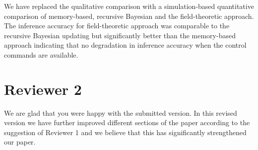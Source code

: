 \documentclass[a4paper,twoside,11pt]{reviewresponse}
\begin{document}
We have replaced the qualitative comparison with a simulation-based quantitative comparison of memory-based, recursive Bayesian and the field-theoretic approach. The inference accuracy for field-theoretic approach was comparable to the recursive Bayesian updating but significantly better than the memory-based approach indicating that no degradation in inference accuracy when the control commands are available. 

\section{Reviewer 2}

We are glad that you were happy with the submitted version. In this revised version we have further improved different sections of the paper according to the suggestion of Reviewer 1 and we believe that this has significantly strengthened our paper. 


%
%
\end{document}
